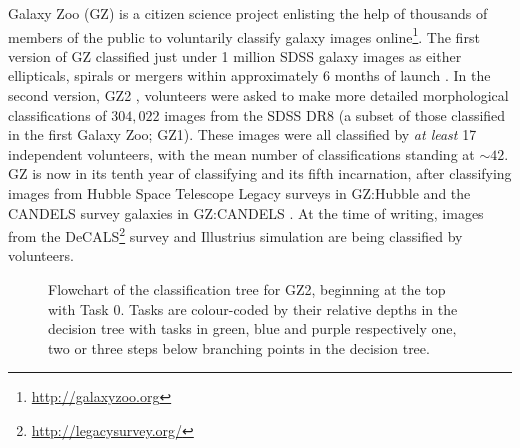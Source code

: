 Galaxy Zoo (GZ) is a citizen science project enlisting the help of thousands of members of the public to voluntarily classify galaxy images online\footnote{\url{http://galaxyzoo.org}}. The first version of GZ classified just under 1 million SDSS galaxy images as either ellipticals, spirals or mergers within approximately 6 months of launch \citep{lintott08, Lintott11}. In the second version, GZ2 \citep{GZ2}, volunteers were asked to make more detailed morphological classifications of $304, 022$ images from the SDSS DR8 (a subset of those classified in the first Galaxy Zoo; GZ1). These images were all classified by \emph{at least} 17 independent volunteers, with the mean number of classifications standing at $\sim42$. GZ is now in its tenth year of classifying and its fifth incarnation, after classifying images from Hubble Space Telescope Legacy surveys in GZ:Hubble \citep{willett16} and the CANDELS survey galaxies in GZ:CANDELS \citep{simmons16}. At the time of writing, images from the DeCALS\footnote{\url{http://legacysurvey.org/}} survey and Illustrius simulation \citep{vogelsberger14, genel14} are being classified by volunteers. 

\begin{figure}
\caption[GZ2 classification decision tree]{Flowchart of the classification tree for GZ2, beginning at the top with Task 0. Tasks are colour-coded by their relative depths in the decision tree with tasks in green, blue and purple respectively one, two or three steps below branching points in the decision tree.}
\label{fig:gztree}
\end{figure}

